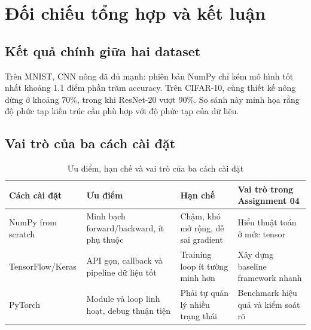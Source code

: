 \documentclass[12pt,a4paper]{report}
\begin{document}
\chapter{Đối chiếu tổng hợp và kết luận}

\section{Kết quả chính giữa hai dataset}
\begin{table}[H]
\centering
\caption{Mô hình tốt nhất và CNN NumPy trên mỗi dataset}
\label{tab:master_summary}
\end{table}

Trên MNIST, CNN nông đã đủ mạnh: phiên bản NumPy chỉ kém mô hình tốt nhất khoảng
1.1 điểm phần trăm accuracy. Trên CIFAR-10, cùng thiết kế nông dừng ở khoảng
70\%, trong khi ResNet-20 vượt 90\%. So sánh này minh họa rằng độ phức tạp kiến
trúc cần phù hợp với độ phức tạp của dữ liệu.

\section{Vai trò của ba cách cài đặt}
\begin{table}[H]
\centering
\caption{Ưu điểm, hạn chế và vai trò của ba cách cài đặt}
\label{tab:implementation_tradeoff}
\small
\begin{tabularx}{\textwidth}{
    >{\raggedright\arraybackslash}p{3.0cm}
    >{\raggedright\arraybackslash}X
    >{\raggedright\arraybackslash}X
    >{\raggedright\arraybackslash}X}
\toprule
\textbf{Cách cài đặt} & \textbf{Ưu điểm} & \textbf{Hạn chế} & \textbf{Vai trò trong Assignment 04} \\
\midrule
NumPy from scratch & Minh bạch forward/backward, ít phụ thuộc & Chậm, khó mở rộng, dễ sai gradient & Hiểu thuật toán ở mức tensor \\
TensorFlow/Keras & API gọn, callback và pipeline dữ liệu tốt & Training loop ít tường minh hơn & Xây dựng baseline framework nhanh \\
PyTorch & Module và loop linh hoạt, debug thuận tiện & Phải tự quản lý nhiều trạng thái & Benchmark hiệu quả và kiểm soát rõ \\
\bottomrule
\end{tabularx}
\end{table}
\end{document}
